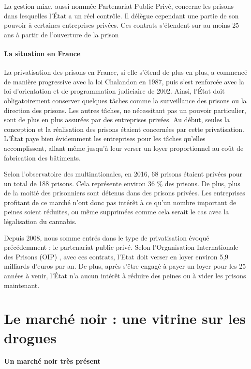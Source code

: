     La gestion mixe, aussi nommée Partenariat Public Privé, concerne les prisons dans lesquelles l’État a un réel contrôle. Il délègue cependant une partie de son pouvoir à certaines entreprises privées. Ces contrats s’étendent sur au moins 25 ans à partir de l’ouverture de la prison


\paragraph{La situation en France}

    La privatisation des prisons en France, si elle s’étend de plus en plus, a commencé de manière progressive avec la loi Chalandon en 1987, puis s’est renforcée avec la loi d’orientation et de programmation judiciaire de 2002. Ainsi, l’État doit obligatoirement conserver quelques tâches comme la surveillance des prisons ou la direction des prisons. Les autres tâches, ne nécessitant pas un pouvoir particulier, sont de plus en plus assurées par des entreprises privées. Au début, seules la conception et la réalisation des prisons étaient concernées par cette privatisation. L’État paye bien évidemment les entreprises pour les tâches qu’elles accomplissent, allant même jusqu’à leur verser un loyer proportionnel au coût de fabrication des bâtiments.

    Selon l’observatoire des multinationales, en 2016, 68 prisons étaient privées pour un total de 188 prisons. Cela représente environ 36 \% des prisons. De plus, plus de la moitié des prisonniers sont détenus dans des prisons privées. Les entreprises profitant de ce marché n’ont donc pas intérêt à ce qu’un nombre important de peines soient réduites, ou même supprimées comme cela serait le cas avec la légalisation du cannabis.

    Depuis 2008, nous somme entrés dans le type de privatisation évoqué précédemment : le partenariat public-privé. Selon l’Organisation Internationale des Prisons (OIP) \cite{knaebel16}, avec ces contrats, l'Etat doit verser en loyer environ 5,9 milliards d’euros par an. De plus, après s’être engagé à payer un loyer pour les 25 années à venir, l’État n’a aucun intérêt à réduire des peines ou à vider les prisons maintenant. 

    
\section{Le marché noir : une vitrine sur les drogues}

\paragraph{Un marché noir très présent}

